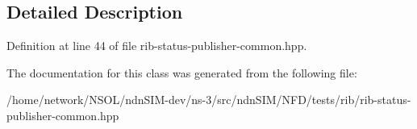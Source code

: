 \subsection{Detailed Description}


Definition at line 44 of file rib-\/status-\/publisher-\/common.\+hpp.



The documentation for this class was generated from the following file\+:\begin{DoxyCompactItemize}
\item 
/home/network/\+N\+S\+O\+L/ndn\+S\+I\+M-\/dev/ns-\/3/src/ndn\+S\+I\+M/\+N\+F\+D/tests/rib/rib-\/status-\/publisher-\/common.\+hpp\end{DoxyCompactItemize}
